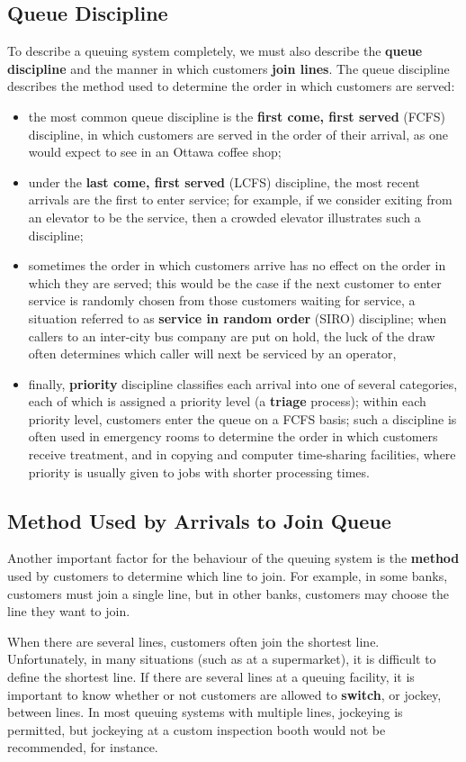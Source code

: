 \subsection{Queue Discipline}
To describe a queuing system completely, we must also describe the \textbf{queue discipline} and the manner in which customers \textbf{join lines}. The queue discipline describes the method used to determine the order in which customers are served: 
\begin{itemize}[noitemsep]
\item the most common queue discipline is the \textbf{first come, first served} (FCFS) discipline, in which customers are served in the order of their arrival, as one would expect to see in an Ottawa coffee shop;
\item under the \textbf{last come, first served} (LCFS) discipline, the most recent arrivals are the first to enter service; for example, if we consider exiting from an elevator to be the service, then a crowded elevator illustrates such a discipline;
\item sometimes the order in which customers arrive has no effect on the order in which they are served; this would be the case if the next customer to enter service is randomly chosen from those customers waiting for service, a situation referred to as \textbf{service in random order} (SIRO) discipline; when callers to an inter-city bus company are put on hold, the luck of the draw often determines which caller will next be serviced by an operator, 
\item finally, \textbf{priority} discipline classifies each arrival into one of several categories, each of which is assigned a priority level (a \textbf{triage} process); within each priority level, customers enter the queue on a FCFS basis; such a discipline is often used in emergency rooms to determine the order in which customers receive treatment, and in copying and computer time-sharing facilities, where priority is usually given to jobs with shorter processing times.
\end{itemize}

\subsection{Method Used by Arrivals to Join Queue}
Another important factor for the behaviour of the queuing system is the \textbf{method} used by customers to determine which line to join. For example, in some banks, customers must join a single line, but in other banks, customers may choose the line they want to join. \par  When there are several lines, customers often join the shortest line. Unfortunately, in many situations (such as at a supermarket), it is difficult to define the shortest line. If there are several lines at a queuing facility, it is important to know whether or not customers are allowed to \textbf{switch}, or jockey, between lines. In most queuing systems with multiple lines, jockeying
is permitted, but jockeying at a custom inspection booth would not be recommended, for instance. 

